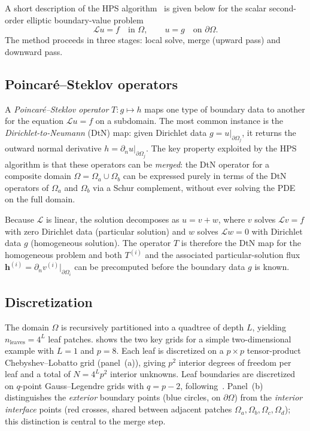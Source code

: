 \documentclass[hidelinks,onefignum,onetabnum]{siamart251216}
\newcommand{\dOmega}{\partial\Omega}
\begin{document}
A short description of the HPS algorithm~\cite{Martinsson2013,melia2025}
is given below for the scalar second-order elliptic boundary-value problem
\begin{equation}\label{eq:scalar_pde}
  \mathcal{L} u = f \quad \text{in } \Omega, \qquad u = g \quad \text{on } \dOmega.
\end{equation}
The method proceeds in three stages: local solve, merge (upward pass) and downward pass.

\subsection{Poincar\'{e}--Steklov operators}

A \emph{Poincar\'{e}--Steklov operator} $T: g \mapsto h$ maps one type of boundary data
to another for the equation $\mathcal{L}u = f$ on a subdomain.
The most common instance is the \emph{Dirichlet-to-Neumann} (DtN) map:
given Dirichlet data $g = u|_{\partial\Omega_j}$, it returns the outward normal derivative
$h = \partial_n u|_{\partial\Omega_j}$.
The key property exploited by the HPS algorithm is that these operators can be
\emph{merged}: the DtN operator for a composite domain $\Omega = \Omega_a \cup \Omega_b$
can be expressed purely in terms of the DtN operators of $\Omega_a$ and $\Omega_b$
via a Schur complement, without ever solving the PDE on the full domain.

Because $\mathcal{L}$ is linear, the solution decomposes as $u = v + w$, where
$v$ solves $\mathcal{L}v = f$ with zero Dirichlet data (particular solution) and
$w$ solves $\mathcal{L}w = 0$ with Dirichlet data $g$ (homogeneous solution).
The operator $T$ is therefore the DtN map for the homogeneous problem and both
$T^{(i)}$ and the associated particular-solution flux
$\mathbf{h}^{(i)} = \partial_n v^{(i)}|_{\partial\Omega_i}$
can be precomputed before the boundary data $g$ is known.

\subsection{Discretization}
\label{sec:discretization}

The domain $\Omega$ is recursively partitioned into a quadtree of depth $L$,
yielding $n_\text{leaves} = 4^L$ leaf patches.
 shows the two key grids for a simple two-dimensional
example with $L = 1$ and $p = 8$.
Each leaf is discretized on a $p \times p$ tensor-product Chebyshev--Lobatto
grid (panel~(a)), giving $p^2$ interior degrees of freedom per leaf and a total of
$N = 4^L p^2$ interior unknowns.
Leaf boundaries are discretized on $q$-point Gauss--Legendre grids with $q = p - 2$,
following~\cite{Gillman2015}.
Panel~(b) distinguishes the \emph{exterior} boundary points (blue circles, on
$\dOmega$) from the \emph{interior interface} points (red crosses, shared between
adjacent patches $\Omega_a, \Omega_b, \Omega_c, \Omega_d$); this distinction is
central to the merge step.
\end{document}
